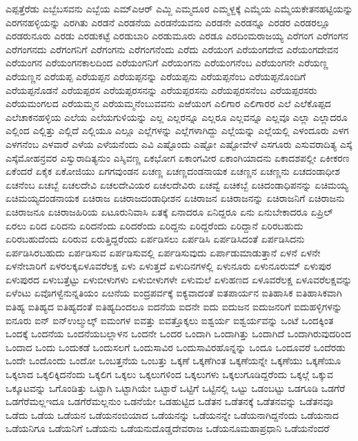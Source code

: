 {ಎಪ್ಪತ್ತೆರೆಡು
ಎಬ್ಬೆಬಸವನು
ಎಬ್ಬೆಯ
ಎಮ್ಎಆರ್
ಎಮ್ಜಿ
ಎಮ್ಮದೂರ
ಎಮ್ಮಳ್ದಕ್ಕೆ
ಎಮ್ಮೆಯ
ಎಮ್ಮೆಯಕೇತನಹಟ್ಟಿಯನ್ನು
ಎರಗನಹಳ್ಳಿಯನ್ನು
ಎರಗಿತು
ಎರಡನೆ
ಎರಡನೆಯ
ಎರಡನೆಯವನು
ಎರಡನೇ
ಎರಡನ್ನೂ
ಎರಡರ
ಎರಡರಲ್ಲೂ
ಎರಡರುನೂರು
ಎರಡು
ಎರಡುಕಟ್ಟೆ
ಎರಡುಬಾರಿ
ಎರಡುಮೂರು
ಎರಡೂ
ಎರದಿಂಮರಾಜಯ್ಯ
ಎರೆಗಂಗ
ಎರೆಗಂಗನ
ಎರೆಗಂಗನದು
ಎರೆಗಂಗನಿಗೆ
ಎರೆಗಂಗನು
ಎರೆಗಂಗನೆಂದು
ಎರೆದು
ಎರೆಯಂಗ
ಎರೆಯಂಗದೇವ
ಎರೆಯಂಗದೇವನ
ಎರೆಯಂಗನ
ಎರೆಯಂಗನಕಾಲದಿಂದ
ಎರೆಯಂಗನಿಗೆ
ಎರೆಯಂಗನು
ಎರೆಯಂಗನೆಂಬ
ಎರೆಯಂಗನೇ
ಎರೆಯಣ್ಣ
ಎರೆಯಣ್ಣನ
ಎರೆಯಪ್ಪ
ಎರೆಯಪ್ಪನ
ಎರೆಯಪ್ಪನನ್ನು
ಎರೆಯಪ್ಪನು
ಎರೆಯಪ್ಪನೆಂಬ
ಎರೆಯಪ್ಪನೊಂದಿಗೆ
ಎರೆಯಪ್ಪನೊಡನೆ
ಎರೆಯಪ್ಪರಸ
ಎರೆಯಪ್ಪರಸನನ್ನು
ಎರೆಯಪ್ಪರಸನು
ಎರೆಯಪ್ಪರಸನೆಂಬ
ಎರೆಯಪ್ಪರಸರು
ಎರೆಯಮಂಗಲದ
ಎರೆಯಮ್ಮನ
ಎರೆಯಮ್ಮನೆಂಬುವವನು
ಎಱೆಯಂಗ
ಎಲಿಗಾರ
ಎಲಿಗಾರರ
ಎಲೆ
ಎಲೆಕೊಪ್ಪದ
ಎಲೆಚಾಕನಹಳ್ಳಿಯ
ಎಲೆಯ
ಎಲೆಯಗುಳಿಯನ್ನು
ಎಲ್ಲ
ಎಲ್ಲರನ್ನೂ
ಎಲ್ಲರೂ
ಎಲ್ಲವನ್ನೂ
ಎಲ್ಲವೂ
ಎಲ್ಲಾ
ಎಲ್ಲಾದರೂ
ಎಲ್ಲಿಂದ
ಎಲ್ಲಿತ್ತು
ಎಲ್ಲಿದೆ
ಎಲ್ಲಿಯೂ
ಎಲ್ಲೂ
ಎಲ್ಲೆಗಳನ್ನು
ಎಲ್ಲೆಗಳಾಗಿದ್ದು
ಎಲ್ಲೆಯನ್ನು
ಎಲ್ಲೆಯಲ್ಲಿ
ಎಳಂದೂರು
ಎಳಗ
ಎಳಗನೆಂಬ
ಎಳವಾರೆ
ಎಳೆಯ
ಎಳೆಯನೆಂದು
ಎವಿ
ಎಷ್ಟೊಂದು
ಎಷ್ಟೋ
ಎಷ್ಟೋವೇಳೆ
ಎಸಗೂರು
ಎಸುವರಾದಿತ್ಯ
ಎಸ್ಕೆ
ಎಸ್ಕೆಮೋಹನ್ರವರ
ಎಸ್ವುರಾದಿತ್ಯನುಂ
ಎಸ್ಶಿವಣ್ಣ
ಏಕಭೋಗ
ಏಕಾಂಗವೀರ
ಏಕಾಂಗಿಯಾದನು
ಏಕಾದಶಪಲ್ಲೀ
ಏಕೀಕರಣ
ಏಕೆಂದರೆ
ಏಕೈಕ
ಏಕೋಜಿಯು
ಏಗಗವುಂಡನ
ಏಚಣ್ಣ
ಏಚಣ್ಣದಂಡನಾಯಕ
ಏಚಣ್ಣನ
ಏಚಣ್ಣನು
ಏಚದಂಡಾಧೀಶ
ಏಚನೆಂಬ
ಏಚಬ್ಬೆ
ಏಚಲದೇವಿ
ಏಚಲದೇವಿಯರ
ಏಚಲದೇವಿರು
ಏಚವ್ವೆ
ಏಚಿಕಬ್ಬೆ
ಏಚಿದಂಡಾಧಿಪನನ್ನು
ಏಚಿಮಯ್ಯ
ಏಚಿಮಯ್ಯದಂಡನಾಯಕ
ಏಚಿರಾಜ
ಏಚಿರಾಜದಂಡಾಧೀಶನ
ಏಚಿರಾಜನ
ಏಚಿರಾಜನನ್ನು
ಏಚಿರಾಜನಿಗೆ
ಏಚಿರಾಜನು
ಏಚಿರಾಜನೂ
ಏಚಿರಾಜಹಿರಿಯ
ಏಟೂರುನಿವಾಸಿ
ಏತಕ್ಕೆ
ಏನಾದರೂ
ಏನಿದ್ದರೂ
ಏನು
ಏನುಬೇಕಾದರೂ
ಏಪ್ರಿಲ್
ಏರಲು
ಏರಿದ
ಏರಿದನು
ಏರಿದನೆಂದು
ಏರಿದರೆಂದು
ಏರಿದ್ದನು
ಏರಿದ್ದರೆಂದು
ಏರಿದ್ದಾನೆ
ಏರಿರಬಹುದು
ಏರಿರಬಹುದೆಂದು
ಏರಿರುವ
ಏರುತ್ತಿದ್ದರೆಂದು
ಏರ್ಪಡಿಸಲು
ಏರ್ಪಡಿಸಿ
ಏರ್ಪಡಿಸಿದಂತೆ
ಏರ್ಪಡಿಸಿದನು
ಏರ್ಪಡಿಸಿರಬಹುದು
ಏರ್ಪಡಿಸುವ
ಏರ್ಪಡಿಸುವಲ್ಲಿ
ಏರ್ಪಡಿಸುವುದು
ಏರ್ಪಾಡುಮಾಡುತ್ತಾನೆ
ಏಳನೆ
ಏಳನೇ
ಏಳನೇಬಾರಿಗೆ
ಏಳರಲಕ್ಕಏಳೂವರೆಲಕ್ಷ
ಏಳು
ಏಳುತ್ತದೆ
ಏಳುದಿನಗಳಲ್ಲಿ
ಏಳುನೂರು
ಏಳುನೂರುಮ್
ಏಳುಪುರ
ಏಳುಪುರದ
ಏಳುಬತ್ತೆಟ್ಟು
ಏಳುಬೀಳುಗಳು
ಏಳುಬೀಳುಗಳೇ
ಏಳುಮಲೆ
ಏಳುಹಣದ
ಏಳೂವರೆಲಕ್ಷ
ಏಳೂವರೆಲಕ್ಷವನ್ನು
ಏಳೆಂಟು
ಏವೊಗಳ್ವೆನುನ್ನತಿಯಂ
ಏೞನೆಯ
ಐಂದ್ರಪರ್ವಕ್ಕೆ
ಐಕ್ಯವಾದಂತೆ
ಐತಪಾರ್ಯನ
ಐತಿಹಾಸಿಕ
ಐತಿಹಾಸಿಕವಾಗಿ
ಐತಿಹ್ಯ
ಐತಿಹ್ಯದ
ಐತಿಹ್ಯದಂತೆ
ಐತಿಹ್ಯದಿಂದಲೂ
ಐದನೆಯ
ಐದನೇ
ಐದು
ಐದುಜನ
ಐದುಜನರಿಗೆ
ಐದುಹಳ್ಳಿಗಳನ್ನು
ಐನೂರು
ಐನ್
ಐನ್ಉಲ್ಮುಲ್ಕ್
ಐಮಂಗಳ
ಐವತ್ತು
ಐವತ್ತೊಕ್ಕಲು
ಐಶ್ವರ್ಯ
ಐಶ್ವರ್ಯವನ್ನು
ಒಂಟೆ
ಒಂದಕ್ಕಿಂತ
ಒಂದಕ್ಕೆ
ಒಂದನೆಯ
ಒಂದನೆಯಬಲ್ಲಾಳನ
ಒಂದನೇ
ಒಂದರ
ಒಂದಾಗಿ
ಒಂದಾಗಿತ್ತು
ಒಂದಾಗಿದೆ
ಒಂದಾಗಿರುವುದರಿಂದ
ಒಂದಾದ
ಒಂದು
ಒಂದುಕಡೆ
ಒಂದುಸಲಗೆ
ಒಂದುಸಾವಿರ
ಒಂದುಸಾವಿರಹೊನ್ನನ್ನು
ಒಂದೂ
ಒಂದೂವರೆ
ಒಂದೆರಡು
ಒಂದೇ
ಒಂದೊಂದು
ಒಂದೋ
ಒಂಬತ್ತನೆಯ
ಒಂಬತ್ತು
ಒಕ್ಕಣೆ
ಒಕ್ಕಣೆಗಿಂತ
ಒಕ್ಕಣೆಯನ್ನೇ
ಒಕ್ಕಣೆಯು
ಒಕ್ಕಣೆಯೂ
ಒಕ್ಕಲಾದ
ಒಕ್ಕಲಿಕ್ಕಿದನೆಂದು
ಒಕ್ಕಲಿಗ
ಒಕ್ಕಲು
ಒಕ್ಕಲುಗಳಿಂದ
ಒಕ್ಕಲುಗಳು
ಒಕ್ಕಲುಗೂಡಿದ್ದರೆಂದು
ಒಕ್ಕಲ್ಗೆ
ಒಕ್ಕುವ
ಒಕ್ಕೂಟವನ್ನು
ಒಗೊಂಡಿತ್ತು
ಒಟ್ಟಾಗಿ
ಒಟ್ಟಾಗಿಯೇ
ಒಟ್ಟಾರೆ
ಒಟ್ಟಿಗೆ
ಒಟ್ಟಿನಲ್ಲಿ
ಒಟ್ಟು
ಒಡಂಬಟ್ಟು
ಒಡಗೂಡಿ
ಒಡಗೆರೆ
ಒಡಗೆರೆಮಲ್ಲಇದೂ
ಒಡಗೆರೆಮಲ್ಲನುಂ
ಒಡನೆಯೇ
ಒಡಹುಟ್ಟಿದ
ಒಡೆತನ
ಒಡೆತನಕ್ಕೆ
ಒಡೆತನವನ್ನು
ಒಡೆತನವೂ
ಒಡೆದು
ಒಡೆಯ
ಒಡೆಯನ
ಒಡೆಯನಂಬಿಯಾದ
ಒಡೆಯನನ್ನು
ಒಡೆಯನನ್ನೇ
ಒಡೆಯನಾಗಿದ್ದನೆಂದು
ಒಡೆಯನಾದ
ಒಡೆಯನಿಗೂ
ಒಡೆಯನಿಗೆ
ಒಡೆಯನು
ಒಡೆಯನುದೊಡ್ಡದೇವರಾಜ
ಒಡೆಯನೂಮಹಾಪ್ರಧಾನಿ
ಒಡೆಯನೆಂದರೆ
}
